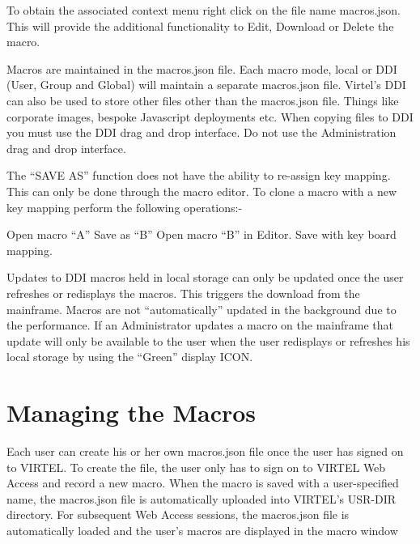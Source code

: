 \documentclass[letterpaper,10pt,english]{sphinxmanual}
\begin{document}


To obtain the associated context menu right click on the file name \textendash{} macros.json. This will provide the additional functionality to Edit, Download or Delete the macro.



Macros are maintained in the macros.json file. Each macro mode, local or DDI (User, Group and Global) will maintain a separate macros.json file. Virtel’s DDI can also be used to store other files other than the macros.json file. Things like corporate images, bespoke Javascript deployments etc. When copying files to DDI you must use the DDI drag and drop interface. Do not use the Administration drag and drop interface.


The “SAVE AS” function does not have the ability to re-assign key mapping. This can only be done through the macro editor. To clone a macro with a new key mapping perform the following operations:-

\begin{sphinxVerbatim}[commandchars=\\\{\}]
Open macro “A”
Save as “B”
Open macro “B” in Editor.
Save with key board mapping.
\end{sphinxVerbatim}


Updates to DDI macros held in local storage can only be updated once the user refreshes or redisplays the macros. This triggers the download from the mainframe. Macros are not “automatically” updated in the background due to the performance. If an Administrator updates a macro on the mainframe that update will only be available to the user when the user redisplays or refreshes his local storage by using the “Green” display ICON.


\section{Managing the Macros}
\label{\detokenize{User_Guide:managing-the-macros}}

Each user can create his or her own macros.json file once the user has signed on to VIRTEL.
To create the file, the user only has to sign on to VIRTEL Web Access and record a new macro. When the macro is
saved with a user-specified name, the macros.json file is automatically uploaded into VIRTEL’s USR-DIR directory.
For subsequent Web Access sessions, the macros.json file is automatically loaded and the user’s macros are displayed
in the macro window
\end{document}
